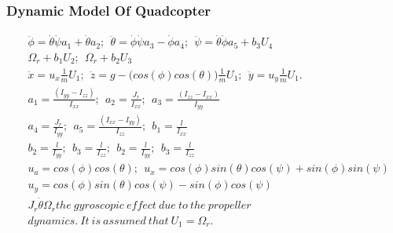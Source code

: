\documentclass[13pt	]{beamer}
\begin{document}
\begin{frame}
\frametitle{Dynamic Model Of Quadcopter} 
\begin{center}
\fontsize{8}{7.2}\selectfont

\begin{align}
&\ddot{\phi}=\dot{\theta}\dot{\psi}a_1 + \dot{\theta}a_2;~~\ddot{\theta}=\dot{\phi}\dot{\psi} a_3 -\dot{\phi}a_4;~~\ddot{\psi}=\dot{\theta}\dot{\phi}a_5+b_3 U_4 \\
&\Omega_r +b_1 U_2;~~\Omega_r +b_2 U_3\\
&\ddot{x}=u_x \frac{1}{m} U_1;~~\ddot{z}=g-\big(cos(\phi)cos(\theta)\big)\frac{1}{m} U_1;~~\ddot{y}=u_y \frac{1}{m}U_1.\\
&a_1=\frac{(I_{yy}-I_{zz})}{I_{xx}};~~a_2=\frac{J_r}{I_{xx}};~~a_3=\frac{(I_{zz}-I_{xx})}{I_{yy}} \\
&a_4=\frac{J_r}{I_{yy}};~~a_5=\frac{(I_{xx}-I_{yy})}{I_{zz}};~~b_1=\frac{l}{I_{xx}}\\
&b_2=\frac{l}{I_{yy}};~~b_3=\frac{l}{I_{zz}};~~b_2=\frac{l}{I_{yy}};~~b_3=\frac{l}{I_{zz}}\\ 
&u_a=cos(\phi)cos(\theta);~~u_x=cos(\phi)sin(\theta)cos(\psi)+sin(\phi)sin(\psi)\\
&u_y=cos(\phi)sin(\theta)cos(\psi)-sin(\phi)cos(\psi)\\
&J_{r}\dot{\theta} \Omega_r the~gyroscopic~effect~due~to~the~propeller\\
&dynamics.~It~is~assumed~that~U_1 = \Omega_r.
\end{align} 
\end{center}
\end{frame}
\end{document}
